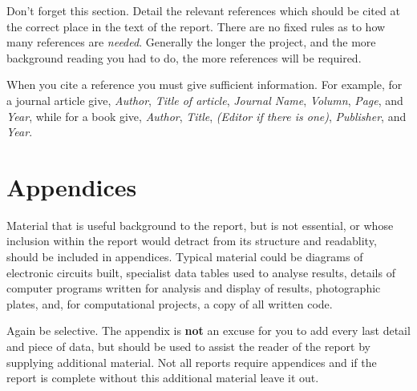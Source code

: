 \documentclass[a4paper,12pt]{article}
\begin{document}
Don't forget this section. Detail the relevant references which
should be cited at the correct place in the text of the report. There
are no fixed rules as to how many references are {\it needed}. Generally
the longer the project, and the more background reading you had to do,
the more references will be required. 

When you cite a reference you must give sufficient information. For
example, for a journal article give, {\it Author}, {\it Title of
article},
{\it Journal Name}, {\it Volumn}, {\it Page}, and {\it Year}, 
while for a book give, {\it Author}, {\it Title},
{\it (Editor if there is one)}, {\it Publisher}, and {\it Year}.        
\appendix
\section{Appendices}

Material that is useful background to the report, but is not essential,
or whose inclusion within the report  would detract from its
structure and readablity, should be included in appendices. Typical
material could be diagrams of electronic circuits built, specialist
data tables used to analyse results, details of computer programs
written for analysis and display of results, photographic plates,
and, for computational projects, a copy of all written code.

Again be selective. The appendix is {\bf not} an excuse for you to add every
last detail and piece of data, but should be used to assist the reader
of the report by supplying additional material. Not all reports require
appendices and if the report is complete without this additional
material leave it out.
\end{document}
